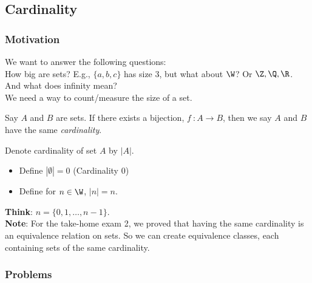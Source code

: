 \subsection{Cardinality}
    
        \subsubsection*{Motivation}
            We want to answer the following questions: \\
            How big are sets? E.g., $\{a,b,c\}$ has size 3, but what about $\W$? Or $\Z, \Q, \R$. \\
            And what does infinity mean? \\
            We need a way to count/measure the size of a set.

            \begin{definition}
                Say $A$ and $B$ are sets. If there exists a bijection, $f \ \colon A \rightarrow B$, then we say $A$ and $B$ have the same \textit{cardinality}.
            \end{definition}

            \begin{notation}
                Denote cardinality of set $A$ by $|A|$. 
                \begin{itemize}
                    \item Define $|\emptyset| = 0$ (Cardinality 0) 
                    \item Define for $n\in \W$, $|n| = n$. 
                \end{itemize}
            \end{notation}
            \textbf{Think}: $n = \{0,1,\dots, n-1\}$. \\
            \textbf{Note}: For the take-home exam 2, we proved that having the same cardinality is an equivalence relation on sets. So we can create equivalence classes, each containing sets of the same cardinality.

        \subsubsection{Problems}



